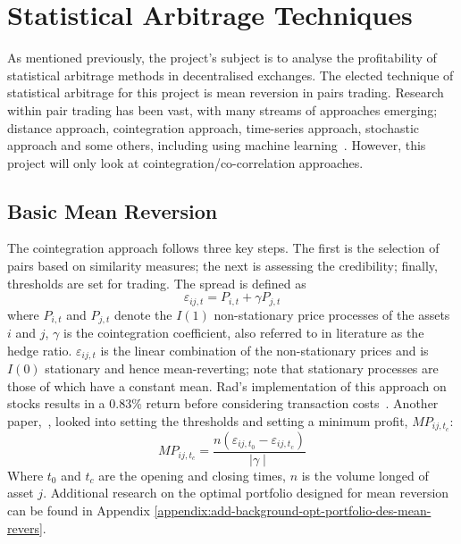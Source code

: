 \section{Statistical Arbitrage Techniques}
As mentioned previously, the project's subject is to analyse the profitability of statistical arbitrage methods in decentralised exchanges. The elected technique of statistical arbitrage for this project is mean reversion in pairs trading. Research within pair trading has been vast, with many streams of approaches emerging; distance approach, cointegration approach, time-series approach, stochastic approach and some others, including using machine learning~\cite{https://doi.org/10.1111/joes.12153}. However, this project will only look at cointegration/co-correlation approaches.

\subsection{Basic Mean Reversion}
The cointegration approach follows three key steps. The first is the selection of pairs based on similarity measures; the next is assessing the credibility; finally, thresholds are set for trading. The spread is defined as $$\varepsilon_{i j,t} = P_{i,t} + \gamma P_{j,t}$$ where $P_{i,t}$ and $P_{j,t}$ denote the $I(1)$ non-stationary price processes of the assets $i$ and $j$, $\gamma$ is the cointegration coefficient, also referred to in literature as the hedge ratio. $\varepsilon_{i j,t}$ is the linear combination of the non-stationary prices and is $I(0)$ stationary and hence mean-reverting; note that stationary processes are those of which have a constant mean. Rad's implementation of this approach on stocks results in a 0.83\% return before considering transaction costs~\cite{RadLowFaff}. Another paper,~\cite{lossProtection}, looked into setting the thresholds and setting a minimum profit, $MP_{ij,t_c}$: $$MP_{ij,t_c} = \frac{n(\varepsilon_{i j,t_0} - \varepsilon_{i j,t_c})}{ \mid \gamma \mid}$$ Where $t_0$ and $t_c$ are the opening and closing times, $n$ is the volume longed of asset $j$. Additional research on the optimal portfolio designed for mean reversion can be found in Appendix \ref{appendix:add-background-opt-portfolio-des-mean-revers}.

